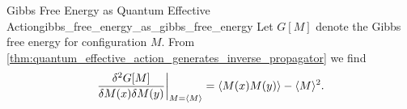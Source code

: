 \documentclass{article}
\begin{document}
\begin{example}{Gibbs Free Energy as Quantum Effective Action}{gibbs_free_energy_as_gibbs_free_energy}
    Let $G[M]$ denote the Gibbs free energy for configuration $M$.
    From \cref{thm:quantum_effective_action_generates_inverse_propagator} we find
    \[ \eval{\frac{\delta^2 G[M]}{\delta M(x) \delta M(y)}}_{M=\langle M \rangle} = \langle M(x) M(y) \rangle - \langle M \rangle^2. \]
\end{example}

% 
% 
\end{document}

